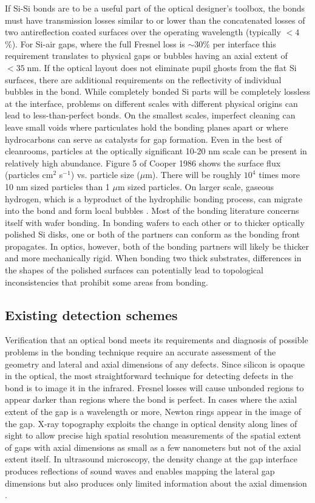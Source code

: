 \documentclass[osajnl,preprint,showpacs,superscriptaddress,12pt]{revtex4-1} %
\begin{document}
If Si-Si bonds are to be a useful part of the optical designer's toolbox, the bonds must have transmission losses similar to or lower than the concatenated losses of two antireflection coated surfaces over the operating wavelength (typically $< 4$\%).  For Si-air gaps, where the full Fresnel loss is $\sim30\%$ per interface this requirement translates to physical gaps or bubbles having an axial extent of $ < 35\;$nm.  If the optical layout does not eliminate pupil ghosts from the flat Si surfaces, there are additional requirements on the reflectivity of individual bubbles in the bond. While completely bonded Si parts will be completely lossless at the interface, problems on different scales with different physical origins can lead to less-than-perfect bonds.  On the smallest scales, imperfect cleaning can leave small voids where particulates hold the bonding planes apart or where hydrocarbons can serve as catalysts for gap formation.  Even in the best of cleanrooms, particles at the optically significant 10-20 nm scale can be present in relatively high abundance. Figure 5 of Cooper 1986\cite{doi:10.1080/02786828608959094} shows the surface flux (particles cm$^2$ s$^{-1}$) vs. particle size ($\mu$m). There will be roughly $10^4$ times more 10 nm sized particles than 1 $\mu$m sized particles.  On larger scale, gaseous hydrogen, which is a byproduct of the hydrophilic bonding process, can migrate into the bond and form local bubbles \cite{Masteika2014}.  Most of the bonding literature concerns itself with wafer bonding.  In bonding wafers to each other or to thicker optically polished Si disks, one or both of the partners can conform as the bonding front propagates.  In optics, however, both of the bonding partners will likely be thicker and more mechanically rigid.  When bonding two thick substrates, differences in the shapes of the polished surfaces can potentially lead to topological inconsistencies that prohibit some areas from bonding.

\subsection{Existing detection schemes}
Verification that an optical bond meets its requirements and diagnosis of possible problems in the bonding technique require an accurate assessment of the geometry and lateral and axial dimensions of any defects.  Since silicon is opaque in the optical, the most straightforward technique for detecting defects in the bond is to image it in the infrared.  Fresnel losses will cause unbonded regions to appear darker than regions where the bond is perfect.  In cases where the axial extent of the gap is a wavelength or more, Newton rings appear in the image of the gap.  X-ray topography \cite{Mitani1990} exploits the change in optical density along lines of sight to allow precise high spatial resolution measurements of the spatial extent of gaps with axial dimensions as small as a few nanometers but not of the axial extent itself. In ultrasound microscopy, the density change at the gap interface produces reflections of sound waves and enables mapping the lateral gap dimensions but also produces only limited information about the axial dimension \cite{2000RScI...71.1869G}.
\end{document}
